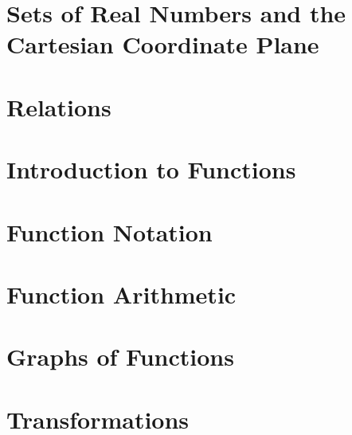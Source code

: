 \section{Sets of Real Numbers and the Cartesian Coordinate Plane}



\newpage

\section{Relations}



\newpage

\section{Introduction to Functions}



\newpage

\section{Function Notation}



\newpage

\section{Function Arithmetic}



\newpage

\section{Graphs of Functions}



\newpage

\section{Transformations}



\newpage